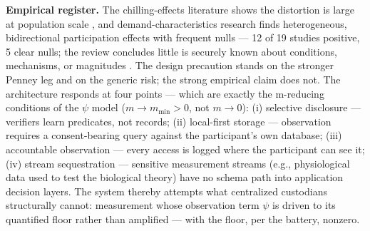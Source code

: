 \documentclass[11pt,twocolumn]{article}
\begin{document}
\textbf{Empirical register.} The chilling-effects literature shows the
distortion is large at population scale \citep{penney2016}, and
demand-characteristics research finds heterogeneous, bidirectional
participation effects with frequent nulls --- 12 of 19 studies positive,
5 clear nulls; the review concludes little is securely known about
conditions, mechanisms, or magnitudes \citep{mccambridge2014}. The
design precaution stands on the stronger Penney leg and on the generic
risk; the strong empirical claim does not. The architecture responds at four
points --- which are exactly the m-reducing conditions of the \(\psi\)
model (\(m \to m_{\min} > 0\), not \(m \to 0\)): (i) selective disclosure --- verifiers learn predicates, not
records; (ii) local-first storage --- observation requires a
consent-bearing query against the participant's own database; (iii)
accountable observation --- every access is logged where the participant
can see it; (iv) stream sequestration --- sensitive measurement streams
(e.g., physiological data used to test the biological theory) have no schema path
into application decision layers. The system thereby attempts what
centralized custodians structurally cannot: measurement whose
observation term \(\psi\) is driven to its quantified floor rather than
amplified --- with the floor, per the battery, nonzero.
\end{document}
